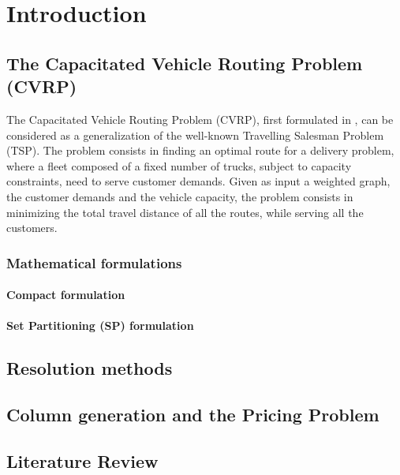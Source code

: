 \chapter{Introduction}

\section{The Capacitated Vehicle Routing Problem (CVRP)}

The Capacitated Vehicle Routing Problem (CVRP), first formulated in \cite{dantzig1959truck},
can be considered as a generalization of
the well-known Travelling Salesman Problem (TSP).
The problem consists in finding an optimal route for a delivery problem,
where a fleet composed of a fixed number of trucks, subject to capacity constraints,
need to serve customer demands.
Given as input a weighted graph, the customer demands and the vehicle capacity,
the problem consists in minimizing the total travel distance of all the routes,
while serving all the customers.

\subsection{Mathematical formulations}

\subsubsection{Compact formulation}

\subsubsection{Set Partitioning (SP) formulation}

\section{Resolution methods}

\section{Column generation and the Pricing Problem}

\section{Literature Review}

